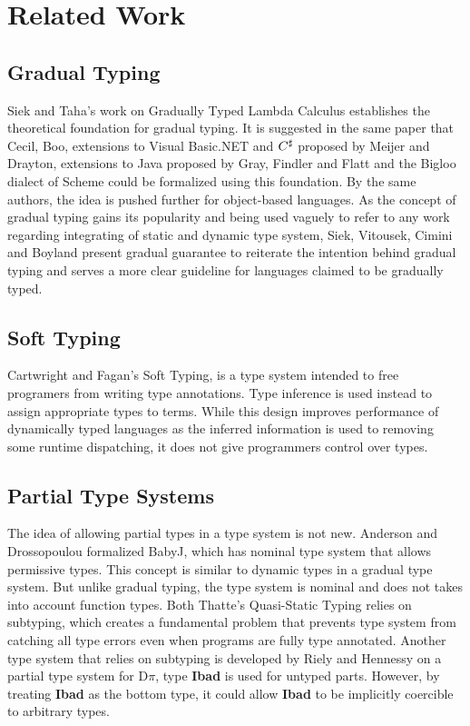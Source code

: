 \section{Related Work}

\subsection{Gradual Typing}
Siek and Taha's work on Gradually Typed Lambda Calculus\cite{siek2006gradual}
establishes the theoretical foundation for gradual typing.
It is suggested in the same paper that Cecil\cite{chambers2004cecil}, Boo\cite{de2005boo},
extensions to Visual Basic.NET and $C^\sharp$ proposed by Meijer and Drayton\cite{meijer2004static},
extensions to Java proposed by Gray, Findler and Flatt\cite{gray2005fine}
and the Bigloo \cite{bres2004compiling}\cite{serrano2002bigloo} dialect of Scheme\cite{abelson1998revised}
could be formalized using this foundation.
By the same authors,
the idea is pushed further for object-based languages\cite{siek2007gradual}.
As the concept of gradual typing gains its popularity and being used vaguely to
refer to any work regarding integrating of static and dynamic type system,
Siek, Vitousek, Cimini and Boyland present gradual guarantee\cite{siek2015refined}
to reiterate the intention behind gradual typing and serves a more clear guideline for
languages claimed to be gradually typed.

\subsection{Soft Typing}
Cartwright and Fagan's Soft Typing\cite{cartwright1991soft},
is a type system intended to free programers from writing type annotations.
Type inference is used instead to assign appropriate types to terms.
While this design improves performance of dynamically typed languages
as the inferred information is used to removing some runtime dispatching,
it does not give programmers control over types.

\subsection{Partial Type Systems}
The idea of allowing partial types in a type system is not new.
Anderson and Drossopoulou formalized BabyJ\cite{anderson2003babyj}, which has
nominal type system that allows permissive types.
This concept is similar to dynamic types in a gradual type system.
But unlike gradual typing, the type system is nominal and does not takes into account function types.
Both Thatte's Quasi-Static Typing\cite{thatte1989quasi} relies on subtyping,
which creates a fundamental problem that prevents type system from catching all type errors even when programs are
fully type annotated.
Another type system that relies on subtyping
is developed by Riely and Hennessy\cite{riely1999trust} on a partial type system for D$\pi$,
type \textbf{Ibad} is used for untyped parts. However, by treating \textbf{Ibad} as the bottom type,
it could allow \textbf{Ibad} to be implicitly coercible to arbitrary types.

